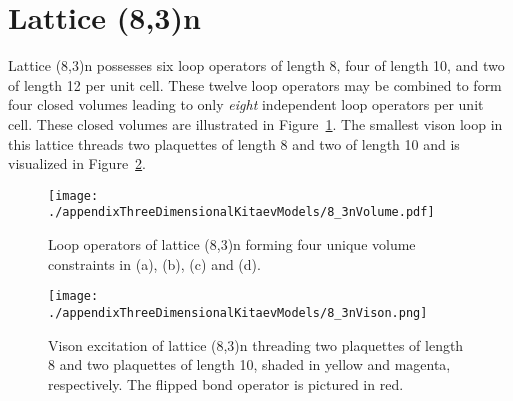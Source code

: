 \section{Lattice (8,3)n}
\label{appendix:ThreeDimensionalKitaevModels_8_3n}
%
%
Lattice (8,3)n possesses six loop operators of length 8, four of length 10, and two of length 12 per unit cell.
These twelve loop operators may be combined to form four closed volumes leading to only \textit{eight} independent loop operators per unit cell.
These closed volumes are illustrated in Figure~\ref{fig:appendix_8_3nVolume}.
The smallest vison loop in this lattice threads two plaquettes of length 8 and two of length 10 and is visualized in Figure~\ref{fig:appendix_8_3nVison}.
%
\begin{figure}[ht!]
	\centering
	\texttt{[image: ./appendixThreeDimensionalKitaevModels/8\_3nVolume.pdf]}
	\caption{
		Loop operators of lattice (8,3)n forming four unique volume constraints in (a), (b), (c) and (d).
	}
	\label{fig:appendix_8_3nVolume}
\end{figure}
%
%
\begin{figure}[ht!]
	\centering
	\texttt{[image: ./appendixThreeDimensionalKitaevModels/8\_3nVison.png]}
	\caption{
		Vison excitation of lattice (8,3)n threading two plaquettes of length 8 and two plaquettes of length 10, shaded in yellow and magenta, respectively.
		The flipped bond operator is pictured in red.
	}
	\label{fig:appendix_8_3nVison}
\end{figure}
%


%
%
